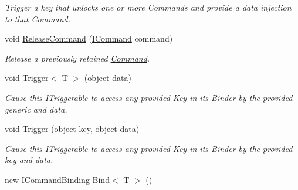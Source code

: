 \begin{DoxyCompactItemize}
\begin{DoxyCompactList}\small\item\em Trigger a key that unlocks one or more Commands and provide a data injection to that \hyperlink{classstrange_1_1extensions_1_1command_1_1impl_1_1_command}{Command}. \end{DoxyCompactList}\item 
void \hyperlink{classstrange_1_1extensions_1_1command_1_1impl_1_1_command_binder_a582e06f6f4dc8c94237e2e2c0d5e098c}{Release\-Command} (\hyperlink{interfacestrange_1_1extensions_1_1command_1_1api_1_1_i_command}{I\-Command} command)
\begin{DoxyCompactList}\small\item\em Release a previously retained \hyperlink{classstrange_1_1extensions_1_1command_1_1impl_1_1_command}{Command}. \end{DoxyCompactList}\item 
\hypertarget{classstrange_1_1extensions_1_1command_1_1impl_1_1_command_binder_a4e5f412df2d54ffd94571acadf6bf862}{void \hyperlink{classstrange_1_1extensions_1_1command_1_1impl_1_1_command_binder_a4e5f412df2d54ffd94571acadf6bf862}{Trigger$<$ T $>$} (object data)}\label{classstrange_1_1extensions_1_1command_1_1impl_1_1_command_binder_a4e5f412df2d54ffd94571acadf6bf862}

\begin{DoxyCompactList}\small\item\em Cause this I\-Triggerable to access any provided Key in its Binder by the provided generic and data. \end{DoxyCompactList}\item 
\hypertarget{classstrange_1_1extensions_1_1command_1_1impl_1_1_command_binder_af5ad5b130439533dda9731f857b33ab6}{void \hyperlink{classstrange_1_1extensions_1_1command_1_1impl_1_1_command_binder_af5ad5b130439533dda9731f857b33ab6}{Trigger} (object key, object data)}\label{classstrange_1_1extensions_1_1command_1_1impl_1_1_command_binder_af5ad5b130439533dda9731f857b33ab6}

\begin{DoxyCompactList}\small\item\em Cause this I\-Triggerable to access any provided Key in its Binder by the provided key and data. \end{DoxyCompactList}\item 
\hypertarget{classstrange_1_1extensions_1_1command_1_1impl_1_1_command_binder_a8f28c0acf4e3deb7c4749d13e0d316d6}{new \hyperlink{interfacestrange_1_1extensions_1_1command_1_1api_1_1_i_command_binding}{I\-Command\-Binding} \hyperlink{classstrange_1_1extensions_1_1command_1_1impl_1_1_command_binder_a8f28c0acf4e3deb7c4749d13e0d316d6}{Bind$<$ T $>$} ()}\label{classstrange_1_1extensions_1_1command_1_1impl_1_1_command_binder_a8f28c0acf4e3deb7c4749d13e0d316d6}


\end{DoxyCompactItemize}
